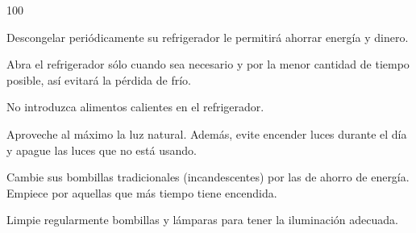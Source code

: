   \begin{dinglist}{100}
  \item Descongelar periódicamente su refrigerador le permitirá ahorrar energía y dinero. 
  \item Abra el refrigerador sólo cuando sea necesario y por la menor cantidad de tiempo posible, así evitará la pérdida de frío. 
  \item No introduzca alimentos calientes en el refrigerador. 
  \item Aproveche al máximo la luz natural. Además, evite encender luces durante el día y apague las luces que no está usando. 
  \item Cambie sus bombillas tradicionales (incandescentes) por las de ahorro de energía. Empiece por aquellas que más tiempo tiene encendida.
 \item Limpie regularmente bombillas y lámparas para tener la iluminación adecuada.

\end{dinglist}

